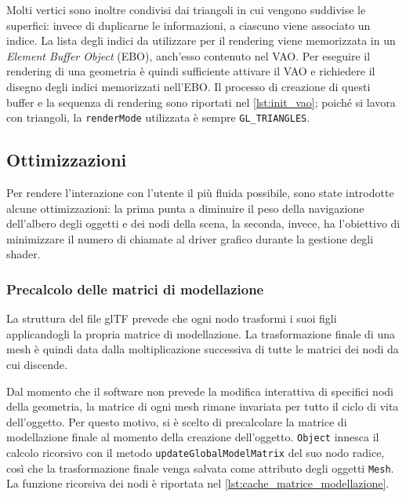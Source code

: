 Molti vertici sono inoltre condivisi dai triangoli in cui vengono suddivise le superfici: invece di duplicarne le informazioni, a ciascuno viene associato un indice.
La lista degli indici da utilizzare per il rendering viene memorizzata in un \emph{Element Buffer Object} (EBO), anch'esso contenuto nel VAO.
Per eseguire il rendering di una geometria è quindi sufficiente attivare il VAO e richiedere il disegno degli indici memorizzati nell'EBO.
Il processo di creazione di questi buffer e la sequenza di rendering sono riportati nel \cref{lst:init_vao}; poiché si lavora con triangoli, la \texttt{renderMode} utilizzata è sempre \texttt{GL\_TRIANGLES}.



\subsection{Ottimizzazioni}
\label{subsec:ottimizzazioni}
Per rendere l'interazione con l'utente il più fluida possibile, sono state introdotte alcune ottimizzazioni: la prima punta a diminuire il peso della navigazione dell'albero degli oggetti e dei nodi della scena, la seconda, invece, ha l'obiettivo di minimizzare il numero di chiamate al driver grafico durante la gestione degli shader.

\subsubsection{Precalcolo delle matrici di modellazione}
La struttura del file glTF prevede che ogni nodo trasformi i suoi figli applicandogli la propria matrice di modellazione.
La trasformazione finale di una mesh è quindi data dalla moltiplicazione successiva di tutte le matrici dei nodi da cui discende.

Dal momento che il software non prevede la modifica interattiva di specifici nodi della geometria, la matrice di ogni mesh rimane invariata per tutto il ciclo di vita dell'oggetto.
Per questo motivo, si è scelto di precalcolare la matrice di modellazione finale al momento della creazione dell'oggetto.
\texttt{Object} innesca il calcolo ricorsivo con il metodo \texttt{updateGlobalModelMatrix} del suo nodo radice, così che la trasformazione finale venga salvata come attributo degli oggetti \texttt{Mesh}.
La funzione ricorsiva dei nodi è riportata nel \cref{lst:cache_matrice_modellazione}.

